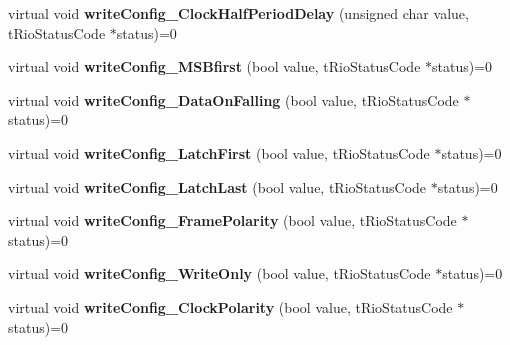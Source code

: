 \begin{DoxyCompactItemize}
\item 
\hypertarget{classnFPGA_1_1nFRC__2012__1__6__4_1_1tSPI_a3964c8c1757711dc0a5b061fa7a9b864}{
virtual void {\bfseries writeConfig\_\-ClockHalfPeriodDelay} (unsigned char value, tRioStatusCode $\ast$status)=0}
\label{classnFPGA_1_1nFRC__2012__1__6__4_1_1tSPI_a3964c8c1757711dc0a5b061fa7a9b864}

\item 
\hypertarget{classnFPGA_1_1nFRC__2012__1__6__4_1_1tSPI_a85842a725e55e5b80d83de17c6160d10}{
virtual void {\bfseries writeConfig\_\-MSBfirst} (bool value, tRioStatusCode $\ast$status)=0}
\label{classnFPGA_1_1nFRC__2012__1__6__4_1_1tSPI_a85842a725e55e5b80d83de17c6160d10}

\item 
\hypertarget{classnFPGA_1_1nFRC__2012__1__6__4_1_1tSPI_a12ed545eb51089e19dd6742b05415339}{
virtual void {\bfseries writeConfig\_\-DataOnFalling} (bool value, tRioStatusCode $\ast$status)=0}
\label{classnFPGA_1_1nFRC__2012__1__6__4_1_1tSPI_a12ed545eb51089e19dd6742b05415339}

\item 
\hypertarget{classnFPGA_1_1nFRC__2012__1__6__4_1_1tSPI_a7b830c2cfb1c9b1da55f8e4f37d92450}{
virtual void {\bfseries writeConfig\_\-LatchFirst} (bool value, tRioStatusCode $\ast$status)=0}
\label{classnFPGA_1_1nFRC__2012__1__6__4_1_1tSPI_a7b830c2cfb1c9b1da55f8e4f37d92450}

\item 
\hypertarget{classnFPGA_1_1nFRC__2012__1__6__4_1_1tSPI_acb1920dc0b1295bb7d3854db684db8b0}{
virtual void {\bfseries writeConfig\_\-LatchLast} (bool value, tRioStatusCode $\ast$status)=0}
\label{classnFPGA_1_1nFRC__2012__1__6__4_1_1tSPI_acb1920dc0b1295bb7d3854db684db8b0}

\item 
\hypertarget{classnFPGA_1_1nFRC__2012__1__6__4_1_1tSPI_ae5c112a63bc5f4f13fc6b8d9ef40e261}{
virtual void {\bfseries writeConfig\_\-FramePolarity} (bool value, tRioStatusCode $\ast$status)=0}
\label{classnFPGA_1_1nFRC__2012__1__6__4_1_1tSPI_ae5c112a63bc5f4f13fc6b8d9ef40e261}

\item 
\hypertarget{classnFPGA_1_1nFRC__2012__1__6__4_1_1tSPI_a79e7492849bec0d6eccf49eb879709dc}{
virtual void {\bfseries writeConfig\_\-WriteOnly} (bool value, tRioStatusCode $\ast$status)=0}
\label{classnFPGA_1_1nFRC__2012__1__6__4_1_1tSPI_a79e7492849bec0d6eccf49eb879709dc}

\item 
\hypertarget{classnFPGA_1_1nFRC__2012__1__6__4_1_1tSPI_a6ddfcc0bbb2e94212a068be40f63950c}{
virtual void {\bfseries writeConfig\_\-ClockPolarity} (bool value, tRioStatusCode $\ast$status)=0}
\label{classnFPGA_1_1nFRC__2012__1__6__4_1_1tSPI_a6ddfcc0bbb2e94212a068be40f63950c}


\end{DoxyCompactItemize}

